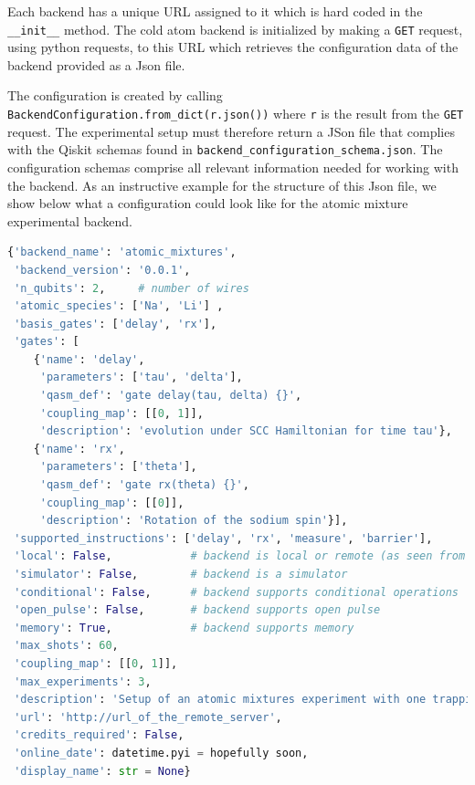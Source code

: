 \documentclass[a4paper, 10pt]{article}
\begin{document}
Each backend has a unique URL assigned to it which is hard coded in the \texttt{\_\_init\_\_} method. The cold atom backend is initialized 
by making a \texttt{GET} request, using python requests, to this URL which retrieves the configuration data of the backend provided as a Json file.

The configuration is created by calling \texttt{BackendConfiguration.from\_dict(r.json())} where \texttt{r} is the result from the \texttt{GET} request.
The experimental setup must therefore return a JSon file that complies with the Qiskit schemas found in \texttt{backend\_configuration\_schema.json}.
The configuration schemas comprise all relevant information needed for working with the backend.
As an instructive example for the structure of this Json file, we show below what a configuration could look like for the atomic mixture experimental backend.

\begin{lstlisting}[language=Python, caption = Example backend configuration that the remote backend server must return when the Qiskit user runs \texttt{provider.get\_backend('atomic\_mixture')}., label={lst:backend_configuration}]
{'backend_name': 'atomic_mixtures',
 'backend_version': '0.0.1',
 'n_qubits': 2,     # number of wires
 'atomic_species': ['Na', 'Li'] , 
 'basis_gates': ['delay', 'rx'],
 'gates': [
    {'name': 'delay',
     'parameters': ['tau', 'delta'],
     'qasm_def': 'gate delay(tau, delta) {}',
     'coupling_map': [[0, 1]],
     'description': 'evolution under SCC Hamiltonian for time tau'},
    {'name': 'rx',
     'parameters': ['theta'],
     'qasm_def': 'gate rx(theta) {}',
     'coupling_map': [[0]],
     'description': 'Rotation of the sodium spin'}],
 'supported_instructions': ['delay', 'rx', 'measure', 'barrier'],
 'local': False,            # backend is local or remote (as seen from user)
 'simulator': False,        # backend is a simulator
 'conditional': False,      # backend supports conditional operations
 'open_pulse': False,       # backend supports open pulse
 'memory': True,            # backend supports memory
 'max_shots': 60,
 'coupling_map': [[0, 1]],
 'max_experiments': 3,
 'description': 'Setup of an atomic mixtures experiment with one trapping site and two atomic species, namely Na and Li.',
 'url': 'http://url_of_the_remote_server',      
 'credits_required': False,
 'online_date': datetime.pyi = hopefully soon,
 'display_name': str = None}\end{lstlisting}
 
\end{document}
